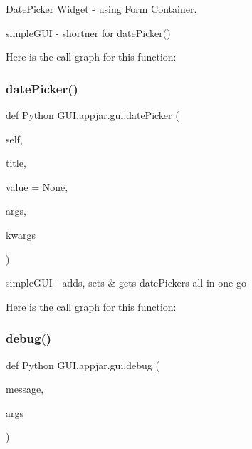 Date\+Picker Widget -\/ using Form Container. 

\begin{DoxyVerb}simpleGUI - shortner for datePicker() \end{DoxyVerb}
 Here is the call graph for this function\+:
\mbox{\label{class_python_01_g_u_i_1_1appjar_1_1gui_a0178a2b0b77cd74bd17216d1ecf67749}} 
\subsubsection{\texorpdfstring{date\+Picker()}{datePicker()}}
{\footnotesize\ttfamily def Python G\+U\+I.\+appjar.\+gui.\+date\+Picker (\begin{DoxyParamCaption}\item[{}]{self,  }\item[{}]{title,  }\item[{}]{value = {\ttfamily None},  }\item[{}]{args,  }\item[{}]{kwargs }\end{DoxyParamCaption})}

\begin{DoxyVerb}simpleGUI - adds, sets & gets datePickers all in one go \end{DoxyVerb}
 Here is the call graph for this function\+:
\mbox{\label{class_python_01_g_u_i_1_1appjar_1_1gui_ad40bff6844abe0bd7011d9598cedcb62}} 
\subsubsection{\texorpdfstring{debug()}{debug()}}
{\footnotesize\ttfamily def Python G\+U\+I.\+appjar.\+gui.\+debug (\begin{DoxyParamCaption}\item[{}]{message,  }\item[{}]{args }\end{DoxyParamCaption})\hspace{0.3cm}{\ttfamily [static]}}

